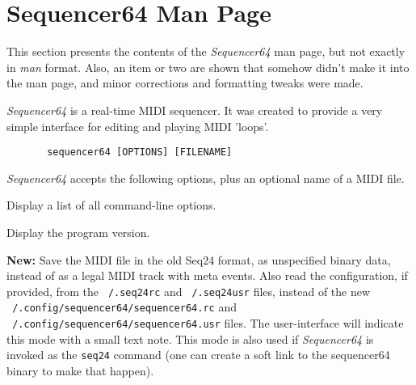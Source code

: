 %
%
%

\section{Sequencer64 Man Page}
\label{sec:seq64_man_page}

   This section presents the contents of the \textsl{Sequencer64} man page, but
   not exactly in \textsl{man} format.  Also, an item or two are shown that
   somehow didn't make it into the man page, and minor corrections and
   formatting tweaks were made.

   \textsl{Sequencer64} is a real-time MIDI sequencer. It was created to
   provide a very simple interface for editing and playing MIDI 'loops'.

   \begin{verbatim}
       sequencer64 [OPTIONS] [FILENAME]
   \end{verbatim}

   \textsl{Sequencer64} accepts the following options, plus an optional name of
   a MIDI file.

   \setcounter{ItemCounter}{0}      %

      Display a list of all command-line options.

      Display the program version.

      \textbf{New:}
      Save the MIDI file in the old Seq24 format, as unspecified
      binary data, instead of as a legal MIDI track with meta events.
      Also read the configuration, if provided, from the
      \texttt{~/.seq24rc} and \texttt{~/.seq24usr} files,
      instead of the new
      \texttt{~/.config/sequencer64/sequencer64.rc} and
      \texttt{~/.config/sequencer64/sequencer64.usr} files.
      The user-interface will indicate this mode with a small text
      note.
      This mode is also used if \textsl{Sequencer64} is invoked as the
      \texttt{seq24} command (one can create a soft link to the sequencer64
      binary to make that happen).

